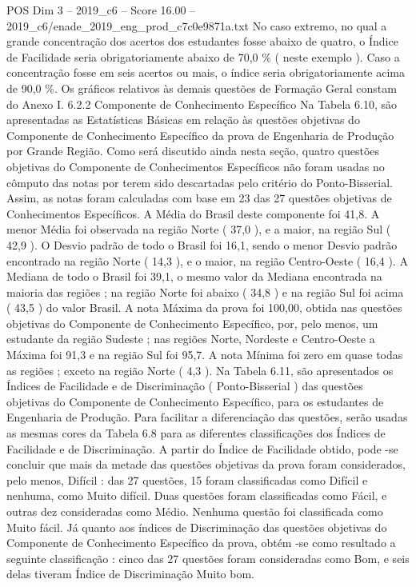 \begin{textsample}{POS Dim 3 – 2019\_c6 – Score 16.00 – 2019\_c6/enade\_2019\_eng\_prod\_c7c0e9871a.txt}
No caso extremo, no qual a grande concentração dos acertos dos estudantes fosse abaixo de quatro, o Índice de Facilidade seria obrigatoriamente abaixo de 70,0 \% ( neste exemplo ).
Caso a concentração fosse em seis acertos ou mais, o índice seria obrigatoriamente acima de 90,0 \%.
Os gráficos relativos às demais questões de Formação Geral constam do Anexo I. 6.2.2 Componente de Conhecimento Específico Na Tabela 6.10, são apresentadas as Estatísticas Básicas em relação às questões objetivas do Componente de Conhecimento Específico da prova de Engenharia de Produção por Grande Região.
Como será discutido ainda nesta seção, quatro questões objetivas do Componente de Conhecimentos Específicos não foram usadas no cômputo das notas por terem sido descartadas pelo critério do Ponto-Bisserial.
Assim, as notas foram calculadas com base em 23 das 27 questões objetivas de Conhecimentos Específicos.
A Média do Brasil deste componente foi 41,8.
A menor Média foi observada na região Norte ( 37,0 ), e a maior, na região Sul ( 42,9 ).
O Desvio padrão de todo o Brasil foi 16,1, sendo o menor Desvio padrão encontrado na região Norte ( 14,3 ), e o maior, na região Centro-Oeste ( 16,4 ).
A Mediana de todo o Brasil foi 39,1, o mesmo valor da Mediana encontrada na maioria das regiões ; na região Norte foi abaixo ( 34,8 ) e na região Sul foi acima ( 43,5 ) do valor Brasil.
A nota Máxima da prova foi 100,00, obtida nas questões objetivas do Componente de Conhecimento Específico, por, pelo menos, um estudante da região Sudeste ; nas regiões Norte, Nordeste e Centro-Oeste a Máxima foi 91,3 e na região Sul foi 95,7.
A nota Mínima foi zero em quase todas as regiões ; exceto na região Norte ( 4,3 ).
Na Tabela 6.11, são apresentados os Índices de Facilidade e de Discriminação ( Ponto-Bisserial ) das questões objetivas do Componente de Conhecimento Específico, para os estudantes de Engenharia de Produção.
Para facilitar a diferenciação das questões, serão usadas as mesmas cores da Tabela 6.8 para as diferentes classificações dos Índices de Facilidade e de Discriminação.
A partir do Índice de Facilidade obtido, pode -se concluir que mais da metade das questões objetivas da prova foram considerados, pelo menos, Difícil : das 27 questões, 15 foram classificadas como Difícil e nenhuma, como Muito difícil.
Duas questões foram classificadas como Fácil, e outras dez consideradas como Médio.
Nenhuma questão foi classificada como Muito fácil.
Já quanto aos índices de Discriminação das questões objetivas do Componente de Conhecimento Específico da prova, obtém -se como resultado a seguinte classificação : cinco das 27 questões foram consideradas como Bom, e seis delas tiveram Índice de Discriminação Muito bom.

\end{textsample}
